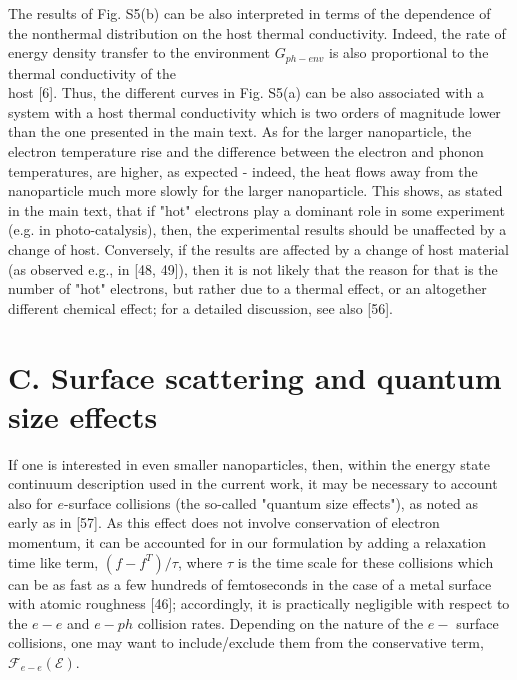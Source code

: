 \documentclass[10pt]{article}
\begin{document}
The results of Fig. S5(b) can be also interpreted in terms of the dependence of the nonthermal distribution on the host thermal conductivity. Indeed, the rate of energy density transfer to the environment $G_{p h-e n v}$ is also proportional to the thermal conductivity of the\\[0pt]
host [6]. Thus, the different curves in Fig. S5(a) can be also associated with a system with a host thermal conductivity which is two orders of magnitude lower than the one presented in the main text. As for the larger nanoparticle, the electron temperature rise and the difference between the electron and phonon temperatures, are higher, as expected - indeed, the heat flows away from the nanoparticle much more slowly for the larger nanoparticle. This shows, as stated in the main text, that if "hot" electrons play a dominant role in some experiment (e.g. in photo-catalysis), then, the experimental results should be unaffected by a change of host. Conversely, if the results are affected by a change of host material (as observed e.g., in [48, 49]), then it is not likely that the reason for that is the number of "hot" electrons, but rather due to a thermal effect, or an altogether different chemical effect; for a detailed discussion, see also [56].

\section*{C. Surface scattering and quantum size effects}
If one is interested in even smaller nanoparticles, then, within the energy state continuum description used in the current work, it may be necessary to account also for $e$-surface collisions (the so-called "quantum size effects"), as noted as early as in [57]. As this effect does not involve conservation of electron momentum, it can be accounted for in our formulation by adding a relaxation time like term, $\left(f-f^{T}\right) / \tau$, where $\tau$ is the time scale for these collisions which can be as fast as a few hundreds of femtoseconds in the case of a metal surface with atomic roughness [46]; accordingly, it is practically negligible with respect to the $e-e$ and $e-p h$ collision rates. Depending on the nature of the $e-$ surface collisions, one may want to include/exclude them from the conservative term, $\mathcal{F}_{e-e}(\mathcal{E})$.
\end{document}
